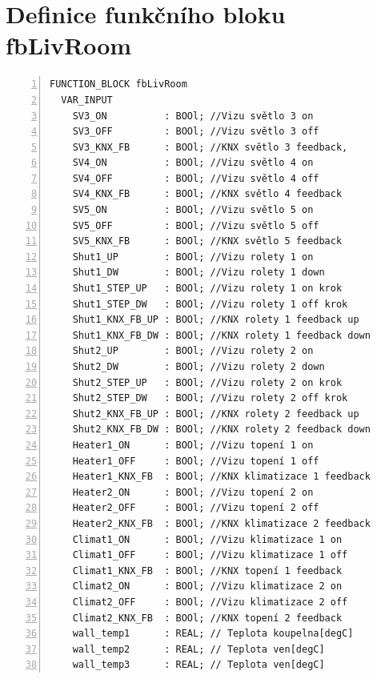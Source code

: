 \chapter{Definice funkčního bloku fbLivRoom}
\label{apend:fbLivRoom}
\begin{lstlisting}[language=ST, breaklines=true, numbers=left, numberstyle=\small, numbersep=10pt, frame=single, basicstyle=\ttfamily\small, caption={Definice funkčního bloku fbLivRoom}, label={lst:fbLivRoom}]
FUNCTION_BLOCK fbLivRoom
  VAR_INPUT
    SV3_ON          : BOOl; //Vizu světlo 3 on
    SV3_OFF         : BOOl; //Vizu světlo 3 off
    SV3_KNX_FB      : BOOl; //KNX světlo 3 feedback,
    SV4_ON          : BOOl; //Vizu světlo 4 on
    SV4_OFF         : BOOl; //Vizu světlo 4 off
    SV4_KNX_FB      : BOOl; //KNX světlo 4 feedback
    SV5_ON          : BOOl; //Vizu světlo 5 on
    SV5_OFF         : BOOl; //Vizu světlo 5 off
    SV5_KNX_FB      : BOOl; //KNX světlo 5 feedback
    Shut1_UP        : BOOl; //Vizu rolety 1 on
    Shut1_DW        : BOOl; //Vizu rolety 1 down
    Shut1_STEP_UP   : BOOl; //Vizu rolety 1 on krok
    Shut1_STEP_DW   : BOOl; //Vizu rolety 1 off krok
    Shut1_KNX_FB_UP : BOOl; //KNX rolety 1 feedback up
    Shut1_KNX_FB_DW : BOOl; //KNX rolety 1 feedback down
    Shut2_UP        : BOOl; //Vizu rolety 2 on
    Shut2_DW        : BOOl; //Vizu rolety 2 down
    Shut2_STEP_UP   : BOOl; //Vizu rolety 2 on krok
    Shut2_STEP_DW   : BOOl; //Vizu rolety 2 off krok
    Shut2_KNX_FB_UP : BOOl; //KNX rolety 2 feedback up
    Shut2_KNX_FB_DW : BOOl; //KNX rolety 2 feedback down
    Heater1_ON      : BOOl; //Vizu topení 1 on
    Heater1_OFF     : BOOl; //Vizu topení 1 off
    Heater1_KNX_FB  : BOOl; //KNX klimatizace 1 feedback
    Heater2_ON      : BOOl; //Vizu topení 2 on
    Heater2_OFF     : BOOl; //Vizu topení 2 off
    Heater2_KNX_FB  : BOOl; //KNX klimatizace 2 feedback
    Climat1_ON      : BOOl; //Vizu klimatizace 1 on
    Climat1_OFF     : BOOl; //Vizu klimatizace 1 off
    Climat1_KNX_FB  : BOOl; //KNX topení 1 feedback
    Climat2_ON      : BOOl; //Vizu klimatizace 2 on
    Climat2_OFF     : BOOl; //Vizu klimatizace 2 off
    Climat2_KNX_FB  : BOOl; //KNX topení 2 feedback
    wall_temp1      : REAL; // Teplota koupelna[degC]
    wall_temp2      : REAL; // Teplota ven[degC]
    wall_temp3      : REAL; // Teplota ven[degC]
\end{lstlisting}
